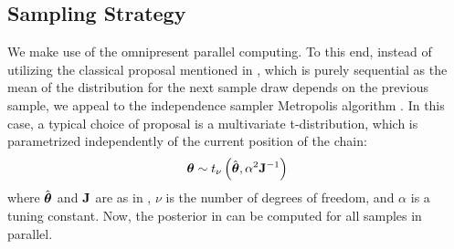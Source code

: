 \subsection{Sampling Strategy} 
We make use of the omnipresent parallel computing. To this end, instead of utilizing the classical proposal mentioned in , which is purely sequential as the mean of the distribution for the next sample draw depends on the previous sample, we appeal to the independence sampler Metropolis algorithm \cite{gelman2004}. In this case, a typical choice of proposal is a multivariate t-distribution, which is parametrized independently of the current position of the chain:
\[
  {\boldsymbol\theta} \sim t_{\nu}\left( \hat{{\boldsymbol\theta}}, \alpha^2 \mathbf{J}^{-1} \right)
\]
where $\hat{{\boldsymbol\theta}}$ and $\mathbf{J}$ are as in , $\nu$ is the number of degrees of freedom, and $\alpha$ is a tuning constant. Now, the posterior in  can be computed for all samples in parallel.
